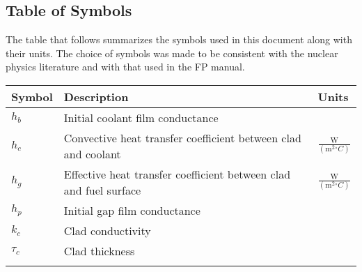 \documentclass[12pt]{article}
\begin{document}
\subsection{Table of Symbols}
\label{Sec:TablofSymb}
The table that follows summarizes the symbols used in this document along with their units. The choice of symbols was made to be consistent with the nuclear physics literature and with that used in the FP manual.
\begin{longtabu}{l X[l] l}
\toprule
Symbol & Description & Units
\\
\midrule
${h_{b}}$ & Initial coolant film conductance & 
\\
${h_{c}}$ & Convective heat transfer coefficient between clad and coolant & $\frac{\text{W}}{(\text{m}^{2}{}^{\circ}C)}$
\\
${h_{g}}$ & Effective heat transfer coefficient between clad and fuel surface & $\frac{\text{W}}{(\text{m}^{2}{}^{\circ}C)}$
\\
${h_{p}}$ & Initial gap film conductance & 
\\
${k_{c}}$ & Clad conductivity & 
\\
${\tau{}_{c}}$ & Clad thickness & 
\\
\bottomrule
\label{Table:TablofSymb}
\end{longtabu}
\end{document}
